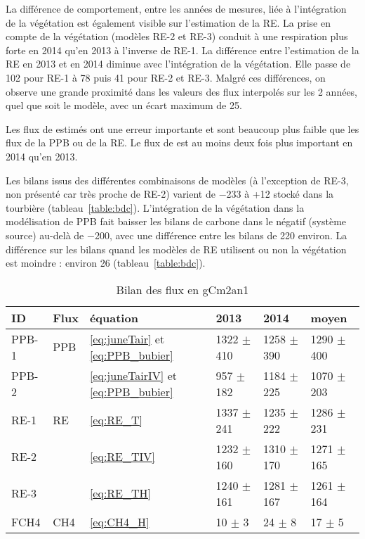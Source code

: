 La différence de comportement, entre les années de mesures, liée à l'intégration de la végétation est également visible sur l'estimation de la RE.
La prise en compte de la végétation (modèles RE-2 et RE-3) conduit à une respiration plus forte en 2014 qu'en 2013 à l'inverse de RE-1.
La différence entre l'estimation de la RE en 2013 et en 2014 diminue avec l'intégration de la végétation.
Elle passe de 102 pour RE-1 à 78 puis 41 pour RE-2 et RE-3.
Malgré ces différences, on observe une grande proximité dans les valeurs des flux interpolés sur les 2 années, quel  que soit le modèle, avec un écart maximum de \SI{25}{\gcma}.

Les flux de \chh estimés ont une erreur importante et sont beaucoup plus faible que les flux de la PPB ou de la RE.
Le flux de \chh est au moins deux fois plus important en 2014 qu'en 2013.

Les bilans issus des différentes combinaisons de modèles (à l'exception de RE-3, non présenté car très proche de RE-2) varient de \SI{-233}{\gcma} à +\SI{12}{\gcma} stocké dans la tourbière (tableau~\ref{table:bdc}).
L'intégration de la végétation dans la modélisation de PPB fait baisser les bilans de carbone dans le négatif (système source) au-delà de \SI{-200}{\gcma}, avec une différence entre les bilans de \SI{220}{\gcma} environ.
La différence sur les bilans quand les modèles de RE utilisent ou non la végétation est moindre : environ \SI{26}{\gcma} (tableau~\ref{table:bdc}).

\begin{table}
\centering
\caption{Bilan des flux en gCm2an1}
\label{table:flux}
\begin{tabular}{llllll}\toprule
ID & Flux & équation & 2013 & 2014 & moyen \\ \midrule
PPB-1 & PPB & \ref{eq:juneTair} et \ref{eq:PPB_bubier} & 1322 $\pm$ 410 & 1258 $\pm$ 390 & 1290 $\pm$ 400 \\
PPB-2 & & \ref{eq:juneTairIV} et \ref{eq:PPB_bubier} & 957 $\pm$ 182 & 1184 $\pm$ 225 & 1070 $\pm$ 203 \\[+1.5ex]
RE-1 & RE & \ref{eq:RE_T} & 1337 $\pm$ 241 & 1235 $\pm$ 222 & 1286 $\pm$ 231 \\
RE-2 & & \ref{eq:RE_TIV} & 1232 $\pm$ 160 & 1310 $\pm$ 170 & 1271 $\pm$ 165\\
RE-3 & & \ref{eq:RE_TH} & 1240 $\pm$ 161 & 1281 $\pm$ 167 & 1261 $\pm$ 164 \\[+1.5ex]
FCH4 & CH4 & \ref{eq:CH4_H} & 10 $\pm$ 3 & 24 $\pm$ 8 & 17 $\pm$ 5 \\
\bottomrule
\end{tabular}
\end{table}



